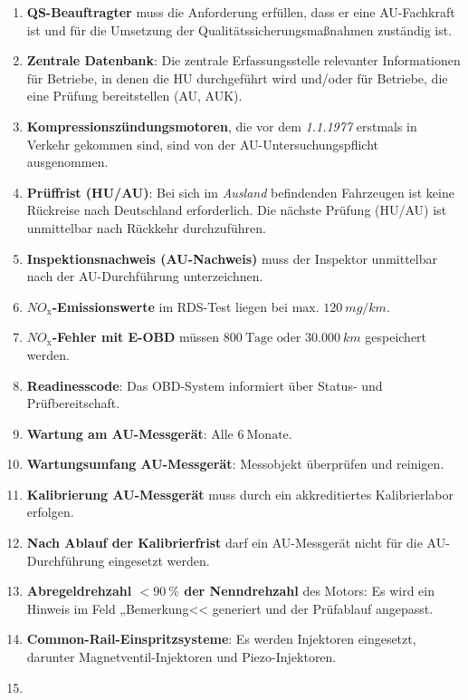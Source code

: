 \documentclass{vorlage-design-main}
\begin{document}
\begin{enumerate}
\def\labelenumi{\arabic{enumi}.}

\item
  \textbf{QS-Beauftragter} muss die Anforderung erfüllen, dass er eine
  AU-Fachkraft ist und für die Umsetzung der
  Qualitätssicherungsmaßnahmen zuständig ist.
\item
  \textbf{Zentrale Datenbank}: Die zentrale Erfassungsstelle relevanter
  Informationen für Betriebe, in denen die HU durchgeführt wird und/oder
  für Betriebe, die eine Prüfung bereitstellen (AU, AUK).
\item
  \textbf{Kompressionszündungsmotoren}, die vor dem \emph{1.1.1977}
  erstmals in Verkehr gekommen sind, sind von der
  AU-Untersuchungspflicht ausgenommen.
\item
  \textbf{Prüffrist (HU/AU)}: Bei sich im \emph{Ausland} befindenden
  Fahrzeugen ist keine Rückreise nach Deutschland erforderlich. Die
  nächste Prüfung (HU/AU) ist unmittelbar nach Rückkehr durchzuführen.
\item
  \textbf{Inspektionsnachweis (AU-Nachweis)} muss der Inspektor
  unmittelbar nach der AU-Durchführung unterzeichnen.
\item
  \textbf{$NO_\text{x}$-Emissionswerte} im RDS-Test liegen bei
  $\boxed{\text{max. } 120~mg/km}$.
\item
  \textbf{$NO_\text{x}$-Fehler mit E-OBD} müssen
  $\boxed{800~\text{Tage  oder } 30.000~km}$ gespeichert werden.
\item
  \textbf{Readinesscode}: Das OBD-System informiert über Status- und
  Prüfbereitschaft.
\item
  \textbf{Wartung am AU-Messgerät}: Alle $\boxed{6~\text{Monate}}$.
\item
  \textbf{Wartungsumfang AU-Messgerät}: Messobjekt überprüfen und
  reinigen.
\item
  \textbf{Kalibrierung AU-Messgerät} muss durch ein akkreditiertes
  Kalibrierlabor erfolgen.
\item
  \textbf{Nach Ablauf der Kalibrierfrist} darf ein AU-Messgerät nicht
  für die AU-Durchführung eingesetzt werden.
\item
  \textbf{Abregeldrehzahl $\boxed{< 90~\%}$ der Nenndrehzahl} des
  Motors: Es wird ein Hinweis im Feld „Bemerkung<< generiert und der
  Prüfablauf angepasst.
\item
  \textbf{Common-Rail-Einspritzsysteme}: Es werden Injektoren
  eingesetzt, darunter Magnetventil-Injektoren und Piezo-Injektoren.
\item

\end{enumerate}
\end{document}
